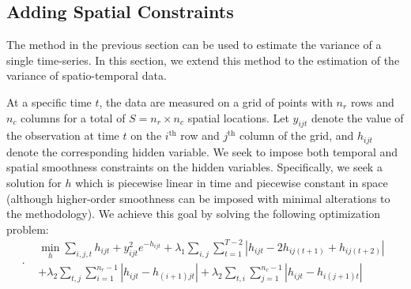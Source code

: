 \documentclass[letterpaper]{article} %
\newcommand{\attn}[1]{\textcolor{red}{TODO: #1}}
\begin{document}

\subsection{Adding Spatial Constraints}
\label{sec:exten}

The method in the previous section can be used to estimate the
variance of a single time-series. In this section, we extend this
method to the estimation of the variance of spatio-temporal data. 

At a specific time $t$, the data are measured on a grid of points with
$n_r$ rows and $n_c$ columns for a total of $S=n_r\times n_c$ spatial
locations. Let $y_{ijt}$ denote the value of the 
observation at time $t$ on the $i^\text{th}$ row and $j^\text{th}$
column of the grid, and $h_{ijt}$ denote the corresponding hidden
variable. We seek to impose both temporal and spatial smoothness
constraints on the hidden variables. Specifically, we seek a solution
for $h$ which is piecewise linear in time and piecewise constant in
space (although higher-order smoothness can be imposed with minimal
alterations to the methodology). We achieve this goal
by solving the following optimization problem: 
{\scriptsize
\begin{equation}
\label{eq:l1tf_var_st}.
\begin{aligned}
&\min_h \sum_{i,j,t}h_{ijt}+y_{ijt}^2e^{-h_{ijt}} +\lambda_1
\sum_{i,j} \sum_{t=1}^{T-2}
\left|h_{ijt}-2h_{ij(t+1)}+h_{ij(t+2)}\right|\\ 
&+\lambda_2 \sum_{t,j} \sum_{i=1}^{n_r-1} \left|h_{ijt}-h_{(i+1)jt}\right|
+\lambda_2 \sum_{t,i} \sum_{j=1}^{n_c-1} \left|h_{ijt}-h_{i(j+1)t}\right|
\end{aligned}
\end{equation}
}%
\end{document}
